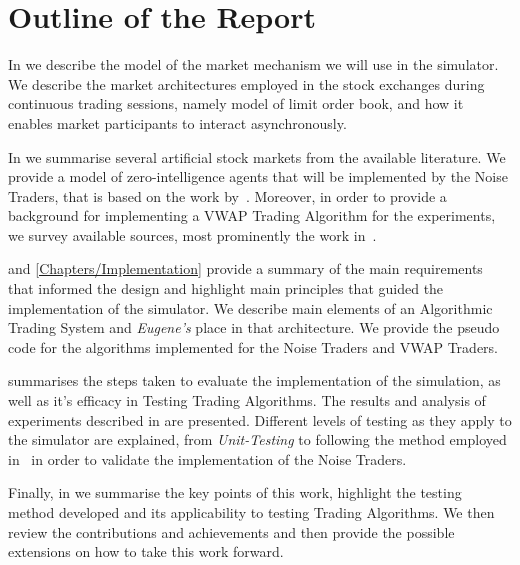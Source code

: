 \section{Outline of the Report \label{Chapters/Introduction/Outline}}

In  we describe the model of the market mechanism we will use in the simulator. We describe the market architectures employed in the stock exchanges during continuous trading sessions, namely model of limit order book, and how it enables market participants to interact asynchronously.

In  we summarise several artificial stock markets from the available literature. We provide a model of zero-intelligence agents that will be implemented by the Noise Traders, that is based on the work by~\citet[chap.~4]{Gilles2006}. Moreover, in order to provide a background for implementing a VWAP Trading Algorithm for the experiments, we survey available sources, most prominently the work in~\cite{Coggins2006, Kakade2004}. 

 and \ref{Chapters/Implementation} provide a summary of the main requirements that informed the design and highlight main principles that guided the implementation of the simulator. We describe main elements of an Algorithmic Trading System and \textit{Eugene's} place in that architecture. We provide the pseudo code for the algorithms implemented for the Noise Traders and VWAP Traders.

 summarises the steps taken to evaluate the implementation of the simulation, as well as it's efficacy in Testing Trading Algorithms. The results and analysis of experiments described in  are presented. Different levels of testing as they apply to the simulator are explained, from \textit{Unit-Testing} to following the method employed in~\cite[chap.~4]{Gilles2006} in order to validate the implementation of the Noise Traders.

Finally, in  we summarise the key points of this work, highlight the testing method developed and its applicability to testing Trading Algorithms. We then review the contributions and achievements and then provide the possible extensions on how to take this work forward.



